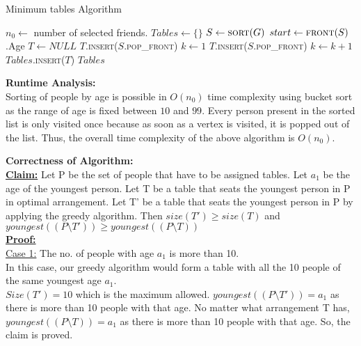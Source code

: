 \documentclass[a4paper]{article}
\begin{document}
\begin{enumerate}[(a)]
    \begin{algorithm}
    \caption{Minimum tables Algorithm}\label{alg:arr}
    \begin{algorithmic}[1]
    \State $n_0 \gets$ number of selected friends.
    \State $Tables \gets \{\}$ 
    \State $S \gets \textsc{sort}(G)$
        \State $start \gets \textsc{front}(S)$.Age
        \State $T \gets NULL$
        \State $T$.\textsc{insert}($S$.\textsc{pop\_front})
        \State $k \gets 1$
            \State $T$.\textsc{insert}($S$.\textsc{pop\_front})
            \State $k \gets k+1$
        \EndWhile
        \State $Tables$.\textsc{insert}($T$)
    \EndWhile
    \State \Return $Tables$
    \EndProcedure
    \end{algorithmic}
    \end{algorithm}
    
    \textbf{Runtime Analysis:}\\
    Sorting of people by age is possible in $O(n_0)$ time complexity using bucket sort as the range of age is fixed between $10$ and $99$. Every person present in the sorted list is only visited once because as soon as a vertex is visited, it is popped out of the list. Thus, the overall time complexity of the above algorithm is $O(n_0)$.
    
    \textbf{Correctness of Algorithm:}\\
    \underline{\textbf{Claim:}} Let P be the set of
    people that have to be assigned tables. Let $a_1$ be the age of the youngest person. Let T be a table that seats the youngest person in P in optimal arrangement. Let T' be a table that seats the youngest person in P by applying the greedy algorithm. Then $size(T') \geq size(T)$ and $youngest((P \setminus T')) \geq youngest((P \setminus T))$\\
    
    \underline{\textbf{Proof:}} \\
    \underline{Case 1:} The no. of people with age $a_1$ is more than 10.\\
    In this case, our greedy algorithm would form a table with all the 10 people of the same youngest age $a_1$.\\
    $Size(T') = 10$ which is the maximum allowed. $youngest((P \setminus T')) = a_1$ as there is more than 10 people with that age. No matter what arrangement T has, $youngest((P \setminus T)) = a_1$ as there is more than 10 people with that age. So, the claim is proved.\\
    

\end{enumerate}
\end{document}
